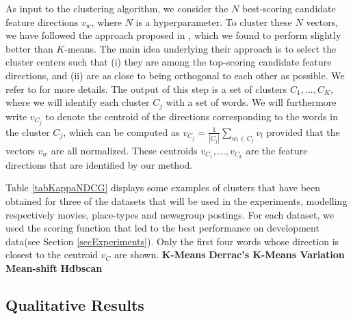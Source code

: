 As input to the clustering algorithm, we consider the $N$ best-scoring candidate feature directions $v_w$, where $N$ is a hyperparameter. To cluster these $N$ vectors, we have followed the approach proposed in \cite{derracAIJ}, which we found to perform slightly better than $K$-means. The main idea underlying their approach is to select the cluster centers such that (i) they are among the top-scoring candidate feature directions, and (ii) are as close to being orthogonal to each other as possible. We refer to \cite{derracAIJ} for more details. 
The output of this step is a set of clusters $C_1,...,C_K$, where we will identify each cluster $C_j$ with a set of words.
We will furthermore write $v_{C_j}$ to denote the centroid of the directions corresponding to the words in the cluster $C_j$, which can be computed as $v_{C_j}= \frac{1}{|C_j|} \sum_{w_l\in C_j} v_l$ provided that the vectors $v_w$ are all normalized. These centroids $v_{C_1},...,v_{C_k}$ are the feature directions that are identified by our method. 

Table \ref{tabKappaNDCG} displays some examples of clusters that have been obtained for three of the datasets that will be used in the experiments, modelling respectively movies, place-types and newsgroup postings. For each dataset, we used the scoring function that led to the best performance on development data(see Section \ref{secExperiments}). Only the first four words whose direction is closest to the centroid $v_C$ are shown.
\noindent \textbf{K-Means}
\noindent \textbf{Derrac's K-Means Variation}
\noindent \textbf{Mean-shift}
\noindent \textbf{Hdbscan}

\subsection{Qualitative Results}

